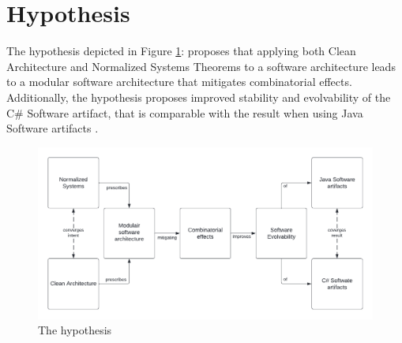 \section{Hypothesis} \label{hypothesis} 

The hypothesis depicted in Figure \ref{fig:hypothesis}:  proposes
that applying both Clean Architecture and Normalized Systems Theorems to a software
architecture leads to a modular software architecture that mitigates combinatorial
effects. Additionally, the hypothesis proposes improved stability and evolvability of
the C\# Software artifact, that is comparable with the result when using Java Software
artifacts \parencites[]{oorts_building_2014, de_bruyn_enabling_2018}.

\begin{figure}[!h]
    \centering
    \includegraphics[width=1\textwidth]{Figures/hypothesis.pdf}
    \caption[The hypothesis]{The hypothesis}
    \label{fig:hypothesis}
\end{figure}